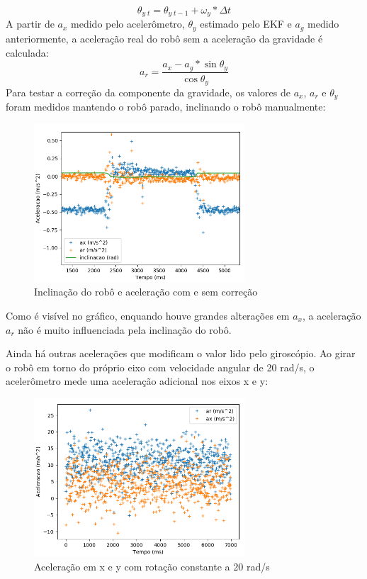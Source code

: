 \documentclass[
	12pt,				%
	openright,			%
	twoside,			%
	convert,
	a4paper,			%
	english,			%
	french,				%
	spanish,			%
	brazil				%
	]{abntex2}
\begin{document}
\begin{equation}
	\theta_{y \; t} = \theta_{y \; t-1} + \omega_y * \Delta t
\end{equation}
A partir de $a_x$ medido pelo acelerômetro, $\theta_y$ estimado pelo EKF e $a_g$ medido anteriormente, a aceleração real do robô sem a aceleração da gravidade é calculada:
\begin{equation}
	a_r = \frac{ a_x - a_g * \sin{\theta_y} }{ \cos{\theta_y} }
\end{equation}
Para testar a correção da componente da gravidade, os valores de $a_x$, $a_r$ e $\theta_y$ foram medidos mantendo o robô parado, inclinando o robô manualmente:
\begin{figure}[H]
	\caption{Inclinação do robô e aceleração com e sem correção}
\begin{center}
   \includegraphics[width=0.7\textwidth]{acc_theta_fix}
\end{center}
\end{figure}
Como é visível no gráfico, enquando houve grandes alterações em $a_x$, a aceleração $a_r$ não é muito influenciada pela inclinação do robô.
\par
Ainda há outras acelerações que modificam o valor lido pelo giroscópio. Ao girar o robô em torno do próprio eixo com velocidade angular de 20 rad/s, o acelerômetro mede uma aceleração adicional nos eixos x e y:
\begin{figure}[H]
	\caption{Aceleração em x e y com rotação constante a 20 rad/s}
\begin{center}
   \includegraphics[width=0.7\textwidth]{acc_x_y_spin}
\end{center}
\end{figure}
\end{document}
